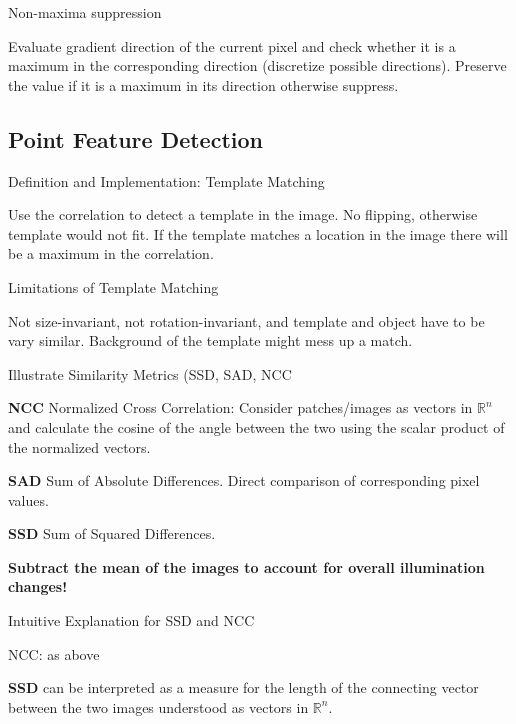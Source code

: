 \documentclass[10pt,a4paper]{scrartcl}
\begin{document}
\begin{multicols*}{2}
\begin{QandA}{Non-maxima suppression}
\item Evaluate gradient direction of the current pixel and check whether it is a maximum in the corresponding direction (discretize possible directions). Preserve the value if it is a maximum in its direction otherwise suppress.
\end{QandA}

\subsection*{Point Feature Detection}

\begin{QandA}{Definition and Implementation: Template Matching}
\item Use the correlation to detect a template in the image. No flipping, otherwise template would not fit. If the template matches a location in the image there will be a maximum in the correlation.
\end{QandA}

\begin{QandA}{Limitations of Template Matching}
\item Not size-invariant, not rotation-invariant, and template and object have to be vary similar. Background of the template might mess up a match.
\end{QandA}

\begin{QandA}{Illustrate Similarity Metrics (SSD, SAD, NCC}
\item \textbf{NCC} Normalized Cross Correlation: Consider patches/images as vectors in $\mathbb{R}^n$ and calculate the cosine of the angle between the two using the scalar product of the normalized vectors.
\item \textbf{SAD} Sum of Absolute Differences. Direct comparison of corresponding pixel values.
\item \textbf{SSD} Sum of Squared Differences.
\item \textbf{Subtract the mean of the images to account for overall illumination changes!}
\end{QandA}

\begin{QandA}{Intuitive Explanation for SSD and NCC}
\item NCC: as above
\item \textbf{SSD} can be interpreted as a measure for the length of the connecting vector between the two images understood as vectors in $\mathbb{R}^n$.
\end{QandA}


\end{multicols*}
\end{document}
